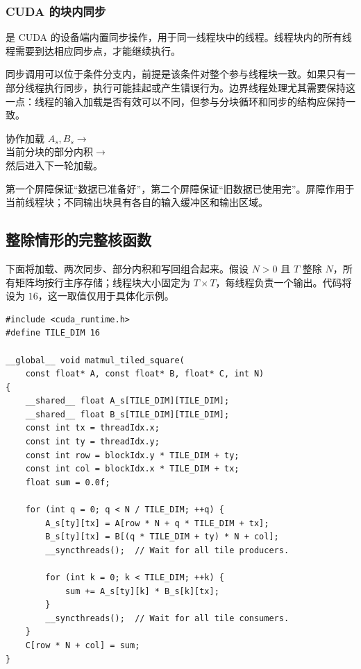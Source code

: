\subsubsection{CUDA 的块内同步}
 是 CUDA 的设备端内置同步操作，用于同一线程块中的线程。线程块内的所有线程需要到达相应同步点，才能继续执行。

同步调用可以位于条件分支内，前提是该条件对整个参与线程块一致。如果只有一部分线程执行同步，执行可能挂起或产生错误行为。边界线程处理尤其需要保持这一点：线程的输入加载是否有效可以不同，但参与分块循环和同步的结构应保持一致。

\begin{keybox}[title={每一轮的执行顺序}]
\centering
协作加载 $A_s,B_s$\quad$\longrightarrow$\quad{}\\[4pt]
当前分块的部分内积\quad$\longrightarrow$\quad{}\\[4pt]
然后进入下一轮加载。
\par\raggedright
第一个屏障保证“数据已准备好”，第二个屏障保证“旧数据已使用完”。屏障作用于当前线程块；不同输出块具有各自的输入缓冲区和输出区域。
\end{keybox}

\subsection{整除情形的完整核函数}
\par\noindent\begin{minipage}{\linewidth}
下面将加载、两次同步、部分内积和写回组合起来。假设 $N>0$ 且 $T$ 整除 $N$，所有矩阵均按行主序存储；线程块大小固定为 $T\times T$，每线程负责一个输出。代码将  设为 $16$，这一取值仅用于具体化示例。

\begin{lstlisting}[caption={带两次块内同步的方阵分块核函数。},label={l6:lst:basic}]
#include <cuda_runtime.h>
#define TILE_DIM 16

__global__ void matmul_tiled_square(
    const float* A, const float* B, float* C, int N)
{
    __shared__ float A_s[TILE_DIM][TILE_DIM];
    __shared__ float B_s[TILE_DIM][TILE_DIM];
    const int tx = threadIdx.x;
    const int ty = threadIdx.y;
    const int row = blockIdx.y * TILE_DIM + ty;
    const int col = blockIdx.x * TILE_DIM + tx;
    float sum = 0.0f;

    for (int q = 0; q < N / TILE_DIM; ++q) {
        A_s[ty][tx] = A[row * N + q * TILE_DIM + tx];
        B_s[ty][tx] = B[(q * TILE_DIM + ty) * N + col];
        __syncthreads();  // Wait for all tile producers.

        for (int k = 0; k < TILE_DIM; ++k) {
            sum += A_s[ty][k] * B_s[k][tx];
        }
        __syncthreads();  // Wait for all tile consumers.
    }
    C[row * N + col] = sum;
}
\end{lstlisting}

\end{minipage}\par

